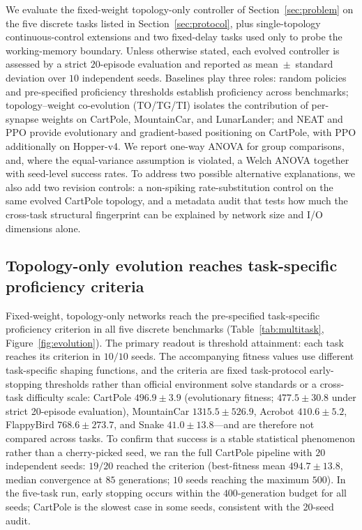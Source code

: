 \documentclass[10pt]{article}
\begin{document}
We evaluate the fixed-weight topology-only controller of Section~\ref{sec:problem}
on the five discrete tasks listed in Section~\ref{sec:protocol}, plus
single-topology continuous-control extensions and two fixed-delay tasks used only
to probe the working-memory boundary. Unless otherwise stated, each evolved controller is
assessed by a strict $20$-episode evaluation and reported as
mean~$\pm$~standard deviation over $10$ independent seeds. Baselines play three
roles: random policies and pre-specified proficiency thresholds establish
proficiency across benchmarks; topology--weight co-evolution (TO/TG/TI) isolates the contribution of
per-synapse weights on CartPole, MountainCar, and LunarLander; and NEAT and PPO provide
evolutionary and gradient-based positioning on CartPole, with PPO additionally on
Hopper-v4. We report one-way ANOVA for group comparisons, and, where the
equal-variance assumption is violated, a Welch ANOVA together with seed-level
success rates. To address two possible alternative explanations, we also add
two revision controls: a non-spiking rate-substitution control on the same
evolved CartPole topology, and a metadata audit that tests how much the
cross-task structural fingerprint can be explained by network size and I/O
dimensions alone.

\subsection{Topology-only evolution reaches task-specific proficiency criteria}
\label{sec:exp-existence}

Fixed-weight, topology-only networks reach the pre-specified task-specific
proficiency criterion in all five discrete benchmarks
(Table~\ref{tab:multitask}, Figure~\ref{fig:evolution}). The primary readout
is threshold attainment: each task reaches its criterion in $10/10$ seeds. The
accompanying fitness values use different task-specific shaping functions, and
the criteria are fixed task-protocol early-stopping thresholds rather than
official environment solve standards or a cross-task difficulty scale:
CartPole $496.9\pm3.9$ (evolutionary fitness;
$477.5\pm30.8$ under strict 20-episode evaluation), MountainCar
$1315.5\pm526.9$, Acrobot $410.6\pm5.2$, FlappyBird $768.6\pm273.7$, and Snake
$41.0\pm13.8$---and are therefore not compared across tasks. To confirm that
success is a stable statistical phenomenon rather than a cherry-picked seed,
we ran the full CartPole pipeline with $20$ independent seeds: $19/20$ reached
the criterion (best-fitness mean $494.7\pm13.8$, median convergence at $85$
generations; $10$ seeds reaching the maximum $500$). In the five-task run, early
stopping occurs within the $400$-generation budget for all seeds; CartPole is the
slowest case in some seeds, consistent with the 20-seed audit.
\end{document}

